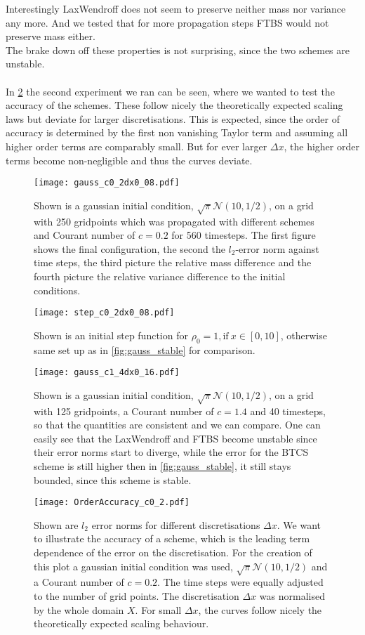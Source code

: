 Interestingly LaxWendroff does not seem to preserve neither mass nor variance any more. And we tested that for more propagation steps FTBS would not preserve mass either.\\
The brake down off these properties is not surprising, since the two schemes are unstable.  \\ \\
In \cref{fig:accuracy} the second experiment we ran can be seen, where we wanted to test the accuracy of the schemes. These follow nicely the theoretically expected scaling laws but deviate for larger discretisations. This is expected, since the order of accuracy is determined by the first non vanishing Taylor term and assuming all higher order terms are comparably small. But for ever larger $\Delta x$, the higher order terms become non-negligible and thus the curves deviate. 
\FloatBarrier
\begin{figure}
\centering
\texttt{[image: gauss\_c0\_2dx0\_08.pdf]}
\caption{Shown is a gaussian initial condition, $\sqrt{\pi}\mathcal{N}(10,1/2)$, on a grid with 250 gridpoints which was propagated with different schemes and Courant number of $c=0.2$ for 560 timesteps. The first figure shows the final configuration, the second the $l_2$-error norm against time steps, the third picture the relative mass difference and the fourth picture the relative variance difference to the initial conditions.}\label{fig:gauss_stable}
\texttt{[image: step\_c0\_2dx0\_08.pdf]}
\caption{Shown is an initial step function for $\rho_0 = 1,  \text{if}\ x \in [0,10] $, otherwise same set up as in \cref{fig:gauss_stable} for comparison. }\label{fig:step_stable}
\end{figure}
\FloatBarrier
\begin{figure}
\centering
\texttt{[image: gauss\_c1\_4dx0\_16.pdf]}
\caption{Shown is a gaussian initial condition, $\sqrt{\pi}\mathcal{N}(10,1/2)$, on a grid with 125 gridpoints, a Courant number of $c=1.4$ and 40 timesteps, so that the quantities are  consistent and we can compare. One can easily see that the LaxWendroff and FTBS become unstable since their error norms start to diverge, while the error for the BTCS scheme is still higher then in \cref{fig:gauss_stable}, it still stays bounded, since this scheme is stable.}\label{fig:gauss_unstable}
\texttt{[image: OrderAccuracy\_c0\_2.pdf]}
\caption{Shown are $l_2$ error norms for different discretisations $\Delta x$. We want to illustrate the accuracy of a scheme, which is the leading term dependence of the error on the discretisation. For the creation of this plot a gaussian initial condition was used, $\sqrt{\pi}\mathcal{N}(10,1/2)$ and a Courant number of $c=0.2$. The time steps were equally adjusted to the number of grid points. The discretisation $\Delta x$ was normalised by the whole domain $X$. For small $\Delta x$, the curves follow nicely the theoretically expected scaling behaviour.}\label{fig:accuracy}
\end{figure}
\FloatBarrier
